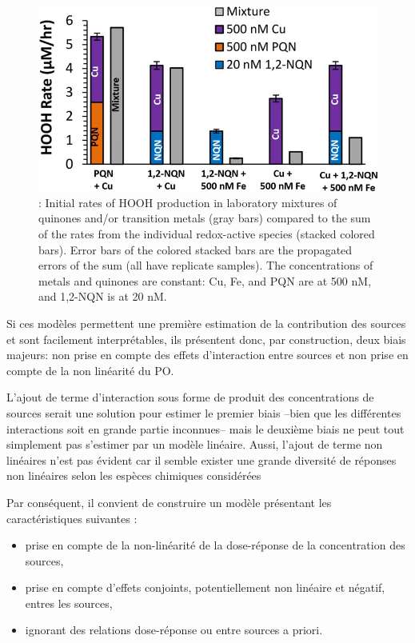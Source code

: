 \begin{figure}[ht]
    \centering
    \includegraphics[width=0.5\linewidth]{figures/chapter05/charrier_hydrogen_2014_fig4.jpg}
    \caption{\cite[figure 4]{charrierHydrogen2014}: Initial rates of HOOH production in
    laboratory mixtures of quinones and/or transition metals (gray bars) compared to the
    sum of the rates from the individual redox-active species (stacked colored bars). Error
    bars of the colored stacked bars are the propagated errors of the sum (all have replicate
    samples). The concentrations of metals and quinones are constant: Cu, Fe, and PQN are at
    500 nM, and 1,2-NQN is at 20 nM.}%
    \label{fig:charrier_hydrogen_2014_fig4}
\end{figure}

Si ces modèles permettent une première estimation de la contribution des sources et sont
facilement interprétables, ils présentent donc, par construction, deux biais majeurs: non
prise en compte des effets d'interaction entre sources et non prise en compte de la non
linéarité du PO.

L'ajout de terme d'interaction sous forme de produit des concentrations de sources serait
une solution pour estimer le premier biais --bien que les différentes interactions soit en grande partie inconnues--
mais le deuxième biais ne peut tout simplement
pas s'estimer par un modèle linéaire. Aussi, l'ajout de terme non linéaires n'est pas
évident car il semble exister une grande diversité de réponses non linéaires selon les
espèces chimiques
considérées~\autocite{charrierDithiothreitol2012,charrierBias2016,calasImportance2017}

Par conséquent, il convient de construire un modèle présentant les caractéristiques
suivantes :
\begin{itemize}
    \item prise en compte de la non-linéarité de la dose-réponse de la concentration des
        sources,
    \item prise en compte d'effets conjoints, potentiellement non linéaire et négatif,
        entres les sources,
    \item ignorant des relations dose-réponse ou entre sources a priori.
\end{itemize}

